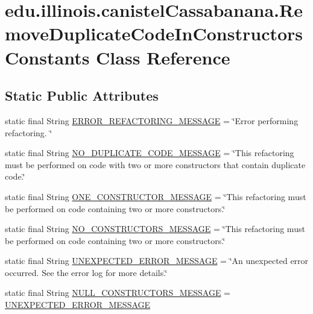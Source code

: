 \hypertarget{classedu_1_1illinois_1_1canistelCassabanana_1_1RemoveDuplicateCodeInConstructorsConstants}{
\section{edu.illinois.canistelCassabanana.RemoveDuplicateCodeInConstructorsConstants Class Reference}
\label{classedu_1_1illinois_1_1canistelCassabanana_1_1RemoveDuplicateCodeInConstructorsConstants}
}
\subsection*{Static Public Attributes}
\begin{DoxyCompactItemize}
\item 
static final String \hyperlink{classedu_1_1illinois_1_1canistelCassabanana_1_1RemoveDuplicateCodeInConstructorsConstants_a2c16519d26ea44a059eb7c581ffba184}{ERROR\_\-REFACTORING\_\-MESSAGE} = \char`\"{}Error performing refactoring. \char`\"{}
\item 
static final String \hyperlink{classedu_1_1illinois_1_1canistelCassabanana_1_1RemoveDuplicateCodeInConstructorsConstants_a690b7d9efb6cfe6f9bb3b0cfbc9ba58f}{NO\_\-DUPLICATE\_\-CODE\_\-MESSAGE} = \char`\"{}This refactoring must be performed on code with two or more constructors that contain duplicate code.\char`\"{}
\item 
static final String \hyperlink{classedu_1_1illinois_1_1canistelCassabanana_1_1RemoveDuplicateCodeInConstructorsConstants_ad01fc3d835596cfcb50ebbf54a9c133e}{ONE\_\-CONSTRUCTOR\_\-MESSAGE} = \char`\"{}This refactoring must be performed on code containing two or more constructors.\char`\"{}
\item 
static final String \hyperlink{classedu_1_1illinois_1_1canistelCassabanana_1_1RemoveDuplicateCodeInConstructorsConstants_a76b9ae1d61eebfbffcef6b6a07e99fa3}{NO\_\-CONSTRUCTORS\_\-MESSAGE} = \char`\"{}This refactoring must be performed on code containing two or more constructors.\char`\"{}
\item 
static final String \hyperlink{classedu_1_1illinois_1_1canistelCassabanana_1_1RemoveDuplicateCodeInConstructorsConstants_a7a26202b57ca9d8cec6eff644aa32b0e}{UNEXPECTED\_\-ERROR\_\-MESSAGE} = \char`\"{}An unexpected error occurred. See the error log for more details.\char`\"{}
\item 
static final String \hyperlink{classedu_1_1illinois_1_1canistelCassabanana_1_1RemoveDuplicateCodeInConstructorsConstants_a2e0637b8a100de734054aff8b12c62b7}{NULL\_\-CONSTRUCTORS\_\-MESSAGE} = \hyperlink{classedu_1_1illinois_1_1canistelCassabanana_1_1RemoveDuplicateCodeInConstructorsConstants_a7a26202b57ca9d8cec6eff644aa32b0e}{UNEXPECTED\_\-ERROR\_\-MESSAGE}

\end{DoxyCompactItemize}
